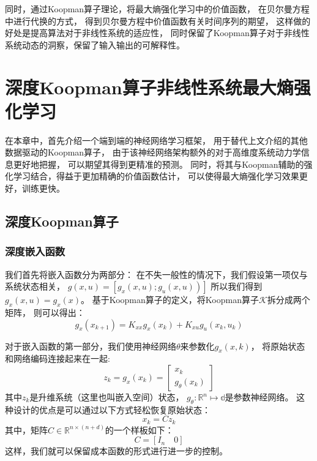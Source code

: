 \documentclass[AutoFakeBold]{LZUThesis}
\begin{document}
同时，通过Koopman算子理论，将最大熵强化学习中的价值函数，
在贝尔曼方程中进行代换的方式，
得到贝尔曼方程中价值函数有关时间序列的期望，
这样做的好处是提高算法对于非线性系统的适应性，
同时保留了Koopman算子对于非线性系统动态的洞察，保留了输入输出的可解释性。


\chapter{深度Koopman算子非线性系统最大熵强化学习}
在本章中，首先介绍一个端到端的神经网络学习框架，
用于替代上文介绍的其他数据驱动的Koopman算子，
由于该神经网络架构额外的对于高维度系统动力学信息更好地把握，
可以期望其得到更精准的预测。
同时，将其与Koopman辅助的强化学习结合，得益于更加精确的价值函数估计，
可以使得最大熵强化学习效果更好，训练更快。

\section{深度Koopman算子}
\subsection{深度嵌入函数}
我们首先将嵌入函数分为两部分：
在不失一般性的情况下，我们假设第一项仅与系统状态相关，
$\left.g(x, u)=\left[g_{x}(x, u) ; g_{u}(x, u)\right)\right]$
所以我们得到$g_x(x, u) = g_x(x)$。
基于Koopman算子的定义，将Koopman算子$\mathcal{K}$拆分成两个矩阵，
则可以得出：
\begin{equation}
  g_{x}\left(x_{k+1}\right)=K_{x x} g_{x}\left(x_{k}\right)+
  K_{x u} g_{u}\left(x_{k}, u_{k}\right)
\end{equation}

对于嵌入函数的第一部分，我们使用神经网络$\theta$来参数化$g_x(x, k)$，
将原始状态和网络编码连接起来在一起:
\begin{equation}
  z_{k}=g_{x}\left(x_{k}\right)=
  \left[\begin{array}{c}
  x_{k} \\
  g_{\theta}\left(x_{k}\right)
  \end{array}\right]
\end{equation}
其中$z_k$是升维系统（这里也叫嵌入空间）状态，
$g_\theta : \mathbb{R}^n \mapsto \mathbb{d}$是参数神经网络。
这种设计的优点是可以通过以下方式轻松恢复原始状态：
\begin{equation}
  x_k = C z_k
\end{equation}
其中，矩阵$C \in \mathbb{R}^{n \times (n + d)}$的一个样板如下：
\begin{equation}
  C = \left[ I_n \quad 0 \right]
\end{equation}
这样，我们就可以保留成本函数的形式进行进一步的控制。
\end{document}
